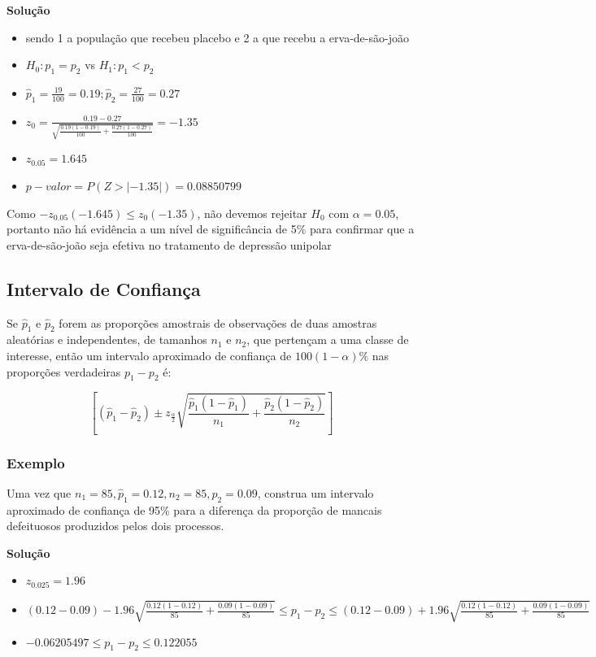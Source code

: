 \documentclass[
]{book}
\providecommand{\tightlist}{%
  \setlength{\itemsep}{0pt}\setlength{\parskip}{0pt}}
\begin{document}
\textbf{Solução}

\begin{itemize}
\tightlist
\item
  sendo 1 a população que recebeu placebo e 2 a que recebu a erva-de-são-joão
\item
  \(H_0: p_1=p_2\) vs \(H_1: p_1 < p_2\)
\item
  \(\hat p_1=\frac{19}{100}=0.19; \hat p_2=\frac{27}{100}=0.27\)
\item
  \(z_0=\frac{0.19-0.27}{\sqrt{\frac{0.19(1-0.19)}{100}+\frac{0.27(1-0.27)}{100}}}=-1.35\)
\item
  \(z_{0.05}=1.645\)
\item
  \(p-valor= P(Z>|-1.35|)=0.08850799\)
\end{itemize}

Como \(-z_{0.05}(-1.645)\leq z_0 (-1.35)\), não devemos rejeitar \(H_0\) com \(\alpha=0.05\), portanto não há evidência a um nível de significância de 5\% para confirmar que a erva-de-são-joão seja efetiva no tratamento de depressão unipolar

\hypertarget{intervalo-de-confianuxe7a-3}{%
\subsection{Intervalo de Confiança}\label{intervalo-de-confianuxe7a-3}}

Se \(\hat p_1\) e \(\hat p_2\) forem as proporções amostrais de observações de duas amostras aleatórias e independentes, de tamanhos \(n_1\) e \(n_2\), que pertençam a uma classe de interesse, então um intervalo aproximado de confiança de \(100(1-\alpha)\%\) nas proporções verdadeiras \(p_1-p_2\) é:

\[\left[(\hat p_1-\hat p_2) \pm z_{\frac{\alpha}{2}}\sqrt{\frac{\hat p_1(1-\hat p_1)}{n_1}+\frac{\hat p_2(1-\hat p_2)}{n_2}}\right]\]

\hypertarget{exemplo-18}{%
\subsubsection{Exemplo}\label{exemplo-18}}

Uma vez que \(n_1=85,\hat p_1=0.12,n_2=85, \hat p_2=0.09\), construa um intervalo aproximado de confiança de 95\% para a diferença da proporção de mancais defeituosos produzidos pelos dois processos.

\textbf{Solução}

\begin{itemize}
\tightlist
\item
  \(z_{0.025}=1.96\)
\item
  \((0.12-0.09) - 1.96\sqrt{\frac{0.12(1-0.12)}{85}+\frac{0.09(1-0.09)}{85}}\leq p_1-p_2 \leq (0.12-0.09) + 1.96\sqrt{\frac{0.12(1-0.12)}{85}+\frac{0.09(1-0.09)}{85}}\)
\item
  \(-0.06205497 \leq p_1-p_2 \leq 0.122055\)
\end{itemize}
\end{document}
